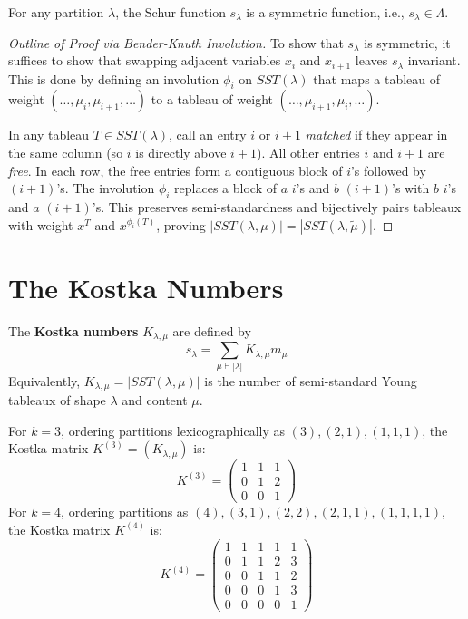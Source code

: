 \documentclass[12pt]{memoir}
\begin{document}
\begin{ptcb}
\begin{Th}
For any partition $\lambda$, the Schur function $s_\lambda$ is a symmetric function, i.e., $s_\lambda \in \Lambda$.
\end{Th}
\end{ptcb}

\begin{proof}[Outline of Proof via Bender-Knuth Involution]
To show that $s_\lambda$ is symmetric, it suffices to show that swapping adjacent variables $x_i$ and $x_{i+1}$ leaves $s_\lambda$ invariant. This is done by defining an involution $\phi_i$ on $SST(\lambda)$ that maps a tableau of weight $(\dots, \mu_i, \mu_{i+1}, \dots)$ to a tableau of weight $(\dots, \mu_{i+1}, \mu_i, \dots)$.

In any tableau $T \in SST(\lambda)$, call an entry $i$ or $i+1$ \emph{matched} if they appear in the same column (so $i$ is directly above $i+1$). All other entries $i$ and $i+1$ are \emph{free}. In each row, the free entries form a contiguous block of $i$'s followed by $(i+1)$'s. The involution $\phi_i$ replaces a block of $a$ $i$'s and $b$ $(i+1)$'s with $b$ $i$'s and $a$ $(i+1)$'s. This preserves semi-standardness and bijectively pairs tableaux with weight $x^T$ and $x^{\phi_i(T)}$, proving $|SST(\lambda, \mu)| = |SST(\lambda, \tilde{\mu})|$.
\end{proof}

\newpage

\section{The Kostka Numbers}

\begin{ptcb}
\begin{Def}
The \textbf{Kostka numbers} $K_{\lambda, \mu}$ are defined by
\[
s_\lambda = \sum_{\mu \vdash |\lambda|} K_{\lambda, \mu} m_\mu
\]
Equivalently, $K_{\lambda, \mu} = |SST(\lambda, \mu)|$ is the number of semi-standard Young tableaux of shape $\lambda$ and content $\mu$.
\end{Def}
\end{ptcb}

\begin{Ex}
For $k=3$, ordering partitions lexicographically as $(3), (2,1), (1,1,1)$, the Kostka matrix $K^{(3)} = (K_{\lambda, \mu})$ is:
\[
K^{(3)} = \begin{pmatrix}
1 & 1 & 1 \\
0 & 1 & 2 \\
0 & 0 & 1
\end{pmatrix}
\]
For $k=4$, ordering partitions as $(4), (3,1), (2,2), (2,1,1), (1,1,1,1)$, the Kostka matrix $K^{(4)}$ is:
\[
K^{(4)} = \begin{pmatrix}
1 & 1 & 1 & 1 & 1 \\
0 & 1 & 1 & 2 & 3 \\
0 & 0 & 1 & 1 & 2 \\
0 & 0 & 0 & 1 & 3 \\
0 & 0 & 0 & 0 & 1
\end{pmatrix}
\]
\end{Ex}
\end{document}
